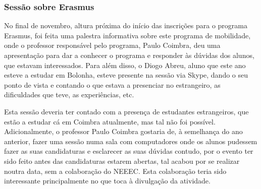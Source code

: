 
\subsubsection{Sessão sobre Erasmus}

No final de novembro, altura próxima do início das inscrições para o programa Erasmus, foi feita uma palestra informativa sobre este programa de mobilidade, onde o professor responsável pelo programa, Paulo Coimbra, deu uma apresentação para dar a conhecer o programa e responder às dúvidas dos alunos, que estavam interessados. Para além disso, o Diogo Abreu, aluno que este ano esteve a estudar em Bolonha, esteve presente na sessão via Skype, dando o seu ponto de vista e contando o que estava a presenciar no estrangeiro, as dificuldades que teve, as experiências, etc.

Esta sessão deveria ter contado com a presença de estudantes estrangeiros, que estão a estudar cá em Coimbra atualmente, mas tal não foi possível. Adicionalmente, o professor Paulo Coimbra gostaria de, à semelhança do ano anterior, fazer uma sessão numa sala com computadores onde os alunos pudessem fazer as suas candidaturas e esclarecer as suas dúvidas contudo, por o evento ter sido feito antes das candidaturas estarem abertas, tal acabou por se realizar noutra data, sem a colaboração do NEEEC. Esta colaboração teria sido interessante principalmente no que toca à divulgação da atividade.